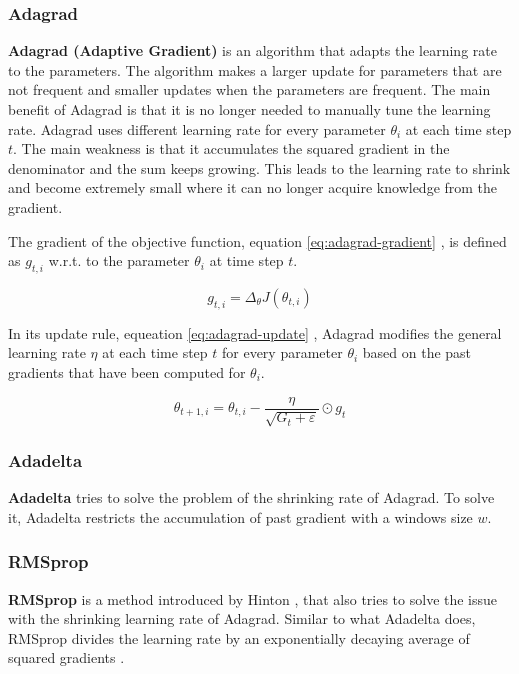 \subsubsection{Adagrad}
\textbf{Adagrad (Adaptive Gradient)} is an algorithm that adapts the learning rate to the parameters. The algorithm makes a larger update for parameters that are not frequent and smaller updates when the parameters are frequent. The main benefit of Adagrad is that it is no longer needed to manually tune the learning rate. Adagrad uses different learning rate for every parameter $\theta _{i}$ at each time step $t$. The main weakness is that it accumulates the squared gradient in the denominator and the sum keeps growing. This leads to the learning rate to shrink and become extremely small where it can no longer acquire knowledge from the gradient. \cite{Hu2011AdaptiveOptimization} 

The gradient of the objective function, equation \ref{eq:adagrad-gradient} \cite{Hu2011AdaptiveOptimization}, is defined as $g_{t,i}$ w.r.t. to the parameter $\theta_{i}$ at time step $t$.

\begin{equation} \label{eq:adagrad-gradient}
	g_{t,i} = \Delta _{\theta}J(\theta_{t,i})
\end{equation}

In its update rule, equeation \ref{eq:adagrad-update} \cite{Hu2011AdaptiveOptimization}, Adagrad modifies the general learning rate $\eta$ at each time step $t$ for every parameter $\theta_{i}$ based on the past gradients that have been computed for $\theta_{i}$.

\begin{equation} \label{eq:adagrad-update}
	\theta_{t+1,i} = \theta_{t,i} - \frac{\eta}{\sqrt{G_{t}+\varepsilon }} \odot g_{t}
\end{equation}

\subsubsection{Adadelta}
\textbf{Adadelta} tries to solve the problem of the shrinking rate of Adagrad. To solve it, Adadelta restricts the accumulation of past gradient with a windows size $w$. \cite{Zeiler2012ADADELTA:Method}

\subsubsection{RMSprop}
\textbf{RMSprop} is a method introduced by Hinton \cite{HintonNeuralDescent}, that also tries to solve the issue with the shrinking learning rate of Adagrad. Similar to what Adadelta does, RMSprop divides the learning rate by an exponentially decaying average of squared gradients \cite{Ruder2016AnAlgorithms}.

